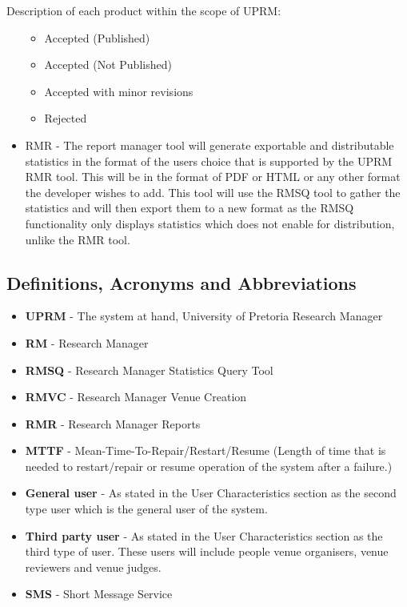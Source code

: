 \begin{paragraph}{Description of each product within the scope of UPRM:}
\begin{itemize}
						\begin{itemize}
							\item Accepted (Published)
							\item Accepted (Not Published)
							\item Accepted with minor revisions
							\item Rejected
						\end{itemize}
					\item RMR -
						The report manager tool will generate exportable and distributable statistics in the format of the users choice that is supported by the UPRM RMR tool. This will be in the format of PDF or HTML or any other format the developer wishes to add. This tool will use the RMSQ tool to gather the statistics and will then export them to a new format as the RMSQ functionality only displays statistics which does not enable for distribution, unlike the RMR tool.
				\end{itemize}
		\end{paragraph}

	\subsection{Definitions, Acronyms and Abbreviations}
		\begin{itemize}
			\item{\textbf{UPRM}} - The system at hand, University of Pretoria Research Manager
			\item{\textbf{RM}} - Research Manager 
			\item{\textbf{RMSQ}} - Research Manager Statistics Query Tool
			\item{\textbf{RMVC}} - Research Manager Venue Creation
			\item{\textbf{RMR}} - Research Manager Reports
			\item{\textbf{MTTF}} - Mean-Time-To-Repair/Restart/Resume (Length of time that is needed to restart/repair or resume operation of the system after a failure.) 
			\item{\textbf{General user}} - As stated in the User Characteristics section as the second type user which is the general user of the system.
			\item {\textbf{Third party user}} - As stated in the User Characteristics section as the third type of user. These users will include people venue organisers, venue reviewers and venue judges.
			\item \textbf{SMS} - Short Message Service
		\end{itemize}


